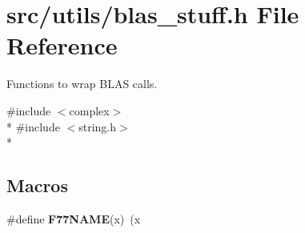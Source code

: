 \section{src/utils/blas\-\_\-stuff.h File Reference}
\label{blas__stuff_8h}


Functions to wrap B\-L\-A\-S calls.  


{\ttfamily \#include $<$complex$>$}\\*
{\ttfamily \#include $<$string.\-h$>$}\\*
\subsection*{Macros}
\begin{DoxyCompactItemize}
\item 
\#define {\bfseries F77\-N\-A\-M\-E}(x)~(x\label{blas__stuff_8h_a9b91c72ded7de2f0b393ea75de53929b}

\end{DoxyCompactItemize}
